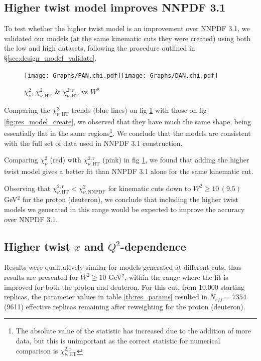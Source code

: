 \documentclass[12pt,a4paper]{report}
\begin{document}
\subsection{Higher twist model improves NNPDF 3.1} \label{sec_results_validate}

To test whether the higher twist model is an improvement over NNPDF 3.1, we validated our models (at the same kinematic cuts they were created) using both the low and high datasets, following the procedure outlined in \S \ref{sec:design_model_validate}.

\begin{figure}[h]
\begin{center}
\texttt{[image: Graphs/PAN.chi.pdf]}\texttt{[image: Graphs/DAN.chi.pdf]}
\caption{$\chi_\nu^2$, $\chi_{\nu,\textrm{HT}}^2$ \& $\chi_{\nu,\textrm{HT}}^{2,\textrm{r}}$ vs $W^2$}
\label{fig:res_model_validate}
\end{center}
\end{figure}

Comparing the $\chi_{\nu,\textrm{HT}}^2$ trends (blue lines) on fig \ref{fig:res_model_validate} with those on fig \ref{fig:res_model_create}, we observed that they have much the same shape, being essentially flat in the same regions\footnote{The absolute value of the statistic has increased due to the addition of more data, but this is unimportant as the correct statistic for numerical comparison is $\chi_{\nu,\textrm{HT}}^{2,\textrm{r}}$}. We conclude that the models are consistent with the full set of data used in NNPDF 3.1 construction.

Comparing $\chi_\nu^2$ (red) with $\chi_{\nu,\textrm{HT}}^{2,\textrm{r}}$ (pink) in fig \ref{fig:res_model_validate}, we found that adding the higher twist model gives a better fit than NNPDF 3.1 alone for the same kinematic cut.

Observing that $\chi_{\nu,\textrm{HT}}^{2,\textrm{r}} < \chi_{\nu,\textrm{NNPDF}}^2$ for kinematic cuts down to $W^2 \ge 10 \, (9.5)$ GeV$^2$ for the proton (deuteron), we conclude that including the higher twist models we generated in this range would be expected to improve the accuracy over NNPDF 3.1.

\subsection{Higher twist $x$ and $Q^2$-dependence} \label{sec:ht_structure}

Results were qualitatively similar for models generated at different cuts, thus results are presented for $W^2 \ge 10$ GeV$^2$, within the range where the fit is improved for both the proton and deuteron. For this cut, from 10,000 starting replicas, the parameter values in table \ref{tb:res_params} resulted in $N_{eff}=7354$ (9611) effective replicas remaining after reweighting for the proton (deuteron).
\end{document}
